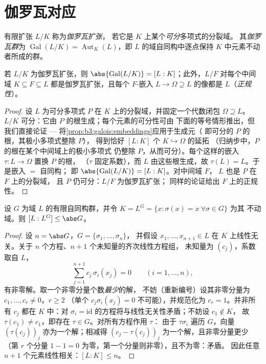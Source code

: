 \section{伽罗瓦对应}

\begin{definition}\label{def:b3:galois:galois}
有限扩张 $L/K$ 称为\emph{伽罗瓦扩张}，
若它是 $K$ 上某个\emph{可分}多项式的分裂域。
其\emph{伽罗瓦群}为
$\operatorname{Gal}(L/K) = \operatorname{Aut}_K(L)$，即
$L$ 的域自同构中逐点保持 $K$ 中元素不动者所成的群。
\end{definition}

\begin{proposition}\label{prop:b3:galois:galoisorder}
若 $L/K$ 为伽罗瓦扩张，则 $\abs{\operatorname{Gal}(L/K)} =
[L:K]$；此外，$L/F$ 对每个中间域 $K
\subseteq F \subseteq L$ 都是伽罗瓦扩张，且每个 $F$-嵌入 $L \to \Omega
\supseteq L$ 的像都是 $L$（\emph{正规性}）。
\end{proposition}

\begin{proof}
设 $L$ 为可分多项式 $P$ 在 $K$ 上的分裂域，并固定一个代数闭包
$\Omega \supseteq L$。$L/K$ 可分：它由
$P$ 的根生成；每个元素的可分性可由
下面的等号情形推出，但我们直接论证 ---
将\cref{prop:b3:galois:embeddings}应用于生成元（
即可分的 $P$ 的根，其极小多项式整除 $P$），
得到恰好 $[L:K]$ 个 $K \hookrightarrow \Omega$ 的延拓
（归纳步中，$P$ 的根在某个中间域上的极小多项式
仍整除 $P$，从而可分）。每个这样的嵌入
$\tau \colon L \to \Omega$ 置换 $P$ 的根，
（$\tau$ 固定系数），而 $L$ 由这些根生成，故 $\tau(L) = L$。于是嵌入
$=$ 自同构；
即 $\abs{\operatorname{Gal}(L/K)} = [L:K]$。对中间域 $F$，
$L$ 也是 $P$ 在 $F$ 上的分裂域，
且 $P$ 仍可分：$L/F$ 为伽罗瓦扩张；
同样的论证给出 $F$ 上的正规性。
\end{proof}

\begin{lemma}[阿廷]\label{lem:b3:galois:artin}
设 $G$ 为域 $L$ 的有限自同构群，并令
$K = L^G = \{x : \sigma(x) = x\ \forall\sigma \in G\}$ 为其
不动域。则 $[L : L^G] \leq \abs G$。
\end{lemma}

\begin{proof}
设 $n = \abs G$，$G = \{\sigma_1, \dots, \sigma_n\}$，
并假设 $x_1, \dots, x_{n+1} \in L$ 在
$K$ 上线性无关。关于 $n$ 个方程、$n+1$ 个未知量的齐次线性方程组，
未知量为 $(c_j)$，系数取自 $L$，
\[
\sum_{j=1}^{n+1} c_j\,\sigma_i(x_j) = 0
\qquad (i = 1, \dots, n),
\]
有非零解。取一个非零分量个数\emph{最少}的解，
不妨（重新编号）设其非零分量为 $c_1, \dots, c_r \neq 0$，$r \geq 2$
（单个 $c_j\sigma_i(x_j) = 0$ 不可能），并规范化为
$c_r = 1$。并非所有 $c_j$ 都在 $K$ 中：对 $\sigma_i =
\mathrm{id}$ 的方程将与线性无关性矛盾；不妨设 $c_1 \notin K$，
故 $\tau(c_1) \ne c_1$，即存在 $\tau \in G$。对所有方程作用 $\tau$：
由于 $\tau\sigma_i$ 遍历 $G$，向量
$(\tau(c_j))_j$ 亦为一个解；相减得 $(c_j -
\tau(c_j))_j$ 为一个解，且非零分量更少
（第 $r$ 个分量 $1 - 1 = 0$ 为零，第一个分量则非零），且不为零：矛盾。
因此任意 $n+1$ 个元素线性相关：$[L:K]
\leq n$。
\end{proof}

